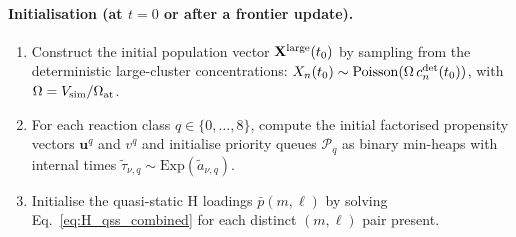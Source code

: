 \documentclass[pdflatex,sn-basic]{sn-jnl} %
\begin{document}
\paragraph{Initialisation (at $t = 0$ or after a frontier
update).}
\begin{enumerate}
  \item Construct the initial population vector
        $\mathbf{X}^{\rm large}(t_0)$ by sampling from the
        deterministic large-cluster concentrations:
        $X_n(t_0) \sim \mathrm{Poisson}(\Omega\,c_n^{\rm det}(t_0))$,
        with $\Omega = V_{\rm sim}/\Omega_{\rm at}$.
  \item For each reaction class $q \in \{0,\ldots,8\}$, compute the
        initial factorised propensity vectors $\mathbf{u}^q$ and $v^q$
        and initialise priority queues $\mathcal{P}_q$ as binary min-heaps
        with internal times $\tilde{\tau}_{\nu,q} \sim
        \mathrm{Exp}(\tilde{a}_{\nu,q})$.
  \item Initialise the quasi-static H loadings $\bar{p}(m,\ell)$ by
        solving Eq.~\eqref{eq:H_qss_combined} for each distinct
        $(m,\ell)$ pair present.
\end{enumerate}
\end{document}
